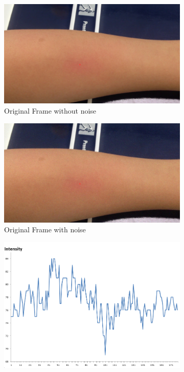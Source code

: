  \begin{figure}
\centering
\begin{subfigure}{.5\textwidth}
  \centering
  \includegraphics[scale=0.26]{img/noisepos}
  \caption{Original Frame without noise}
  \label{fig:sub1}
\end{subfigure}%
\begin{subfigure}{.5\textwidth}
  \centering
  \includegraphics[scale=0.26]{img/noise}
  \caption{Original Frame with noise}
  \label{fig:sub2}
\end{subfigure}
\begin{subfigure}{.45\textwidth}
  \centering
  \includegraphics[scale=0.23]{img/intense}

\end{subfigure}
\end{figure}
